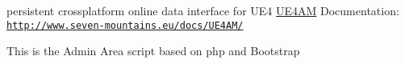 persistent crossplatform online data interface for U\-E4 \hyperlink{class_u_e4_a_m}{U\-E4\-A\-M} Documentation\-: \href{http://www.seven-mountains.eu/docs/UE4AM/}{\tt http\-://www.\-seven-\/mountains.\-eu/docs/\-U\-E4\-A\-M/}

This is the Admin Area script based on php and Bootstrap 